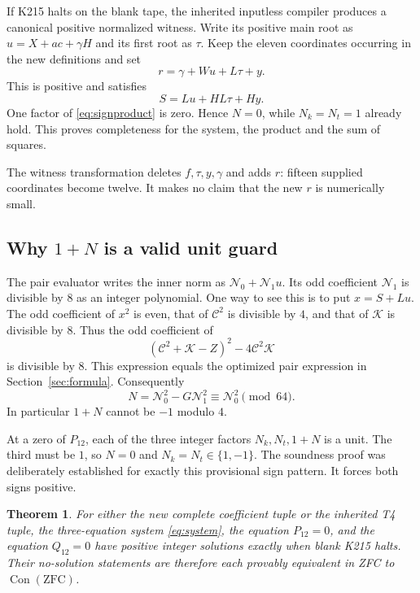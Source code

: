 \documentclass[11pt]{article}
\newtheorem{theorem}{Theorem}[section]
\theoremstyle{remark}\newtheorem{remark}[theorem]{Remark}
\newcommand{\Con}{\operatorname{Con}}
\begin{document}
If K215 halts on the blank tape, the inherited inputless compiler
produces a canonical positive normalized witness. Write its positive
main root as \(u=X+ac+\gamma H\) and its first root as \(\tau\).
Keep the eleven coordinates occurring in the new definitions and set
\begin{equation}\label{eq:complete-r}
 r=\gamma+Wu+L\tau+y.
\end{equation}
This is positive and satisfies
\[
 S=Lu+HL\tau+Hy.
\]
One factor of \eqref{eq:signproduct} is zero. Hence \(N=0\),
while \(N_k=N_t=1\) already hold. This proves completeness for
the system, the product and the sum of squares.

The witness transformation deletes \(f,\tau,y,\gamma\) and adds \(r\):
fifteen supplied coordinates become twelve. It makes no claim that
the new \(r\) is numerically small.

\subsection{Why \texorpdfstring{\(1+N\)}{1+N} is a valid unit guard}\label{sec:parity}

The pair evaluator writes the inner norm as
\(\mathcal N_0+\mathcal N_1u\).
Its odd coefficient \(\mathcal N_1\) is divisible by \(8\) as an
integer polynomial. One way to see this is to put \(x=S+Lu\).
The odd coefficient of \(x^2\) is even, that of \(\mathcal C^2\)
is divisible by \(4\), and that of \(\mathcal K\) is divisible
by \(8\). Thus the odd coefficient of
\[
 (\mathcal C^2+\mathcal K-Z)^2-4\mathcal C^2\mathcal K
\]
is divisible by \(8\). This expression equals the optimized
pair expression in Section~\ref{sec:formula}.
Consequently
\[
 N=\mathcal N_0^2-G\mathcal N_1^2
      \equiv \mathcal N_0^2\pmod{64}.
\]
In particular \(1+N\) cannot be \(-1\) modulo \(4\).

At a zero of \(P_{12}\), each of the three integer factors
\(N_k,N_t,1+N\) is a unit. The third must be \(1\), so \(N=0\)
and \(N_k=N_t\in\{1,-1\}\). The soundness proof was deliberately
established for exactly this provisional sign pattern. It forces
both signs positive.

\begin{theorem}\label{thm:positive}
For either the new complete coefficient tuple or the inherited T4
tuple, the three-equation system \eqref{eq:system},
the equation \(P_{12}=0\), and the equation \(Q_{12}=0\) have
positive integer solutions exactly when blank K215 halts.
Their no-solution statements are therefore each provably equivalent
in ZFC to \(\Con(\mathrm{ZFC})\).
\end{theorem}
\end{document}
